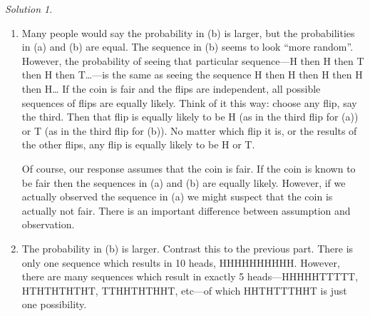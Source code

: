 \documentclass[
  letterpaper,
  DIV=11,
  numbers=noendperiod]{scrreprt}
\theoremstyle{plain}
\theoremstyle{definition}
\theoremstyle{definition}
\theoremstyle{definition}
\theoremstyle{remark}
\newtheorem{refsolution}{Solution}[chapter]
\begin{document}
\begin{tcolorbox}[enhanced jigsaw, opacityback=0, rightrule=.15mm, coltitle=black, colframe=quarto-callout-tip-color-frame, toprule=.15mm, colbacktitle=quarto-callout-tip-color!10!white, opacitybacktitle=0.6, left=2mm, toptitle=1mm, breakable, title={Solution (click to expand)}, bottomtitle=1mm, colback=white, leftrule=.75mm, titlerule=0mm, arc=.35mm, bottomrule=.15mm]

\begin{refsolution}
\leavevmode

\begin{enumerate}
\def\labelenumi{\arabic{enumi}.}
\item
  Many people would say the probability in (b) is larger, but the
  probabilities in (a) and (b) are equal\footnotemark{}. The sequence in
  (b) seems to look ``more random''. However, the probability of seeing
  that particular sequence---H then H then T then H then T\ldots---is
  the same as seeing the sequence H then H then H then H then H\ldots{}
  If the coin is fair and the flips are independent, all possible
  sequences of flips are equally likely. Think of it this way: choose
  any flip, say the third. Then that flip is equally likely to be H (as
  in the third flip for (a)) or T (as in the third flip for (b)). No
  matter which flip it is, or the results of the other flips, any flip
  is equally likely to be H or T.

  Of course, our response assumes that the coin is fair. If the coin is
  known to be fair then the sequences in (a) and (b) are equally likely.
  However, if we actually observed the sequence in (a) we might suspect
  that the coin is actually not fair. There is an important difference
  between assumption and observation.
\item
  The probability in (b) is larger. Contrast this to the previous part.
  There is only one sequence which results in 10 heads, HHHHHHHHHH.
  However, there are many sequences\footnotemark{} which result in
  exactly 5 heads---HHHHHTTTTT, HTHTHTHTHT, TTHHTHTHHT, etc---of which
  HHTHTTTHHT is just one possibility.
\end{enumerate}

\label{sol-probability-interpret1}

\end{refsolution}

\end{tcolorbox}

\end{document}
